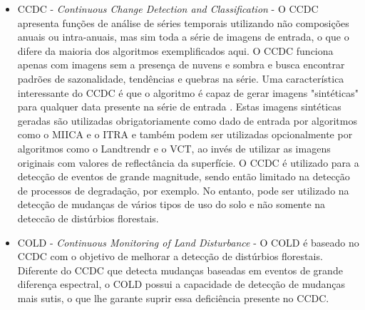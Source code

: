 \documentclass[12pt,a4paper]{article}
\begin{document}
\begin{itemize}
  \item CCDC - \textit{Continuous Change Detection and Classification} \citep{ZHU2014152} - O CCDC apresenta funções de análise de séries temporais utilizando não composições anuais ou intra-anuais, mas sim toda a série de imagens de entrada, o que o difere da maioria dos algoritmos exemplificados aqui. O CCDC funciona apenas com imagens sem a presença de nuvens e sombra e busca encontrar padrões de sazonalidade, tendências e quebras na série. Uma característica interessante do CCDC é que o algoritmo é capaz de gerar imagens "sintéticas" para qualquer data presente na série de entrada \citep{ZHU201567}. Estas imagens sintéticas geradas são utilizadas obrigatoriamente como dado de entrada por algoritmos como o MIICA e o ITRA e também podem ser utilizadas opcionalmente por algoritmos como o Landtrendr e o VCT, ao invés de utilizar as imagens originais com valores de reflectância da superfície. O CCDC é utilizado para a detecção de eventos de grande magnitude, sendo então limitado na detecção de processos de degradação, por exemplo. No entanto, pode ser utilizado na detecção de mudanças de vários tipos de uso do solo e não somente na deteccão de distúrbios florestais.
  
  \item COLD - \textit{Continuous Monitoring of Land Disturbance} \citep{Cohen2020} - O COLD é baseado no CCDC com o objetivo de melhorar a detecção de distúrbios florestais. Diferente do CCDC que detecta mudanças baseadas em eventos de grande diferença espectral, o COLD possui a capacidade de detecção de mudanças mais sutis, o que lhe garante suprir essa deficiência presente no CCDC.
  

\end{itemize}
\end{document}
